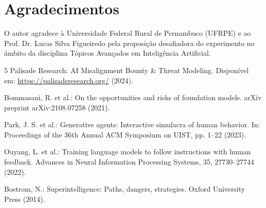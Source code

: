 \documentclass[runningheads]{llncs}
\begin{document}
\section*{Agradecimentos}
O autor agradece \`{a} Universidade Federal Rural de Pernambuco (UFRPE) e ao Prof. Dr. Lucas Silva Figueiredo pela proposi\c{c}\~{a}o desafiadora do experimento no \'{a}mbito da disciplina T\'{o}picos Avan\c{c}ados em Intelig\^{e}ncia Artificial.

\begin{thebibliography}{5}
Palisade Research: AI Misalignment Bounty \& Threat Modeling. Dispon\'{i}vel em: \url{https://palisaderesearch.org/} (2024).

Bommasani, R. et al.: On the opportunities and risks of foundation models. arXiv preprint arXiv:2108.07258 (2021).

Park, J. S. et al.: Generative agents: Interactive simulacra of human behavior. In: Proceedings of the 36th Annual ACM Symposium on UIST, pp. 1--22 (2023).

Ouyang, L. et al.: Training language models to follow instructions with human feedback. Advances in Neural Information Processing Systems, 35, 27730--27744 (2022).

Bostrom, N.: Superintelligence: Paths, dangers, strategies. Oxford University Press (2014).
\end{thebibliography}
\end{document}
